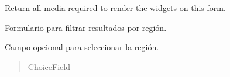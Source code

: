 \documentclass[letterpaper,10pt,spanish]{sphinxmanual}
\begin{document}
\begin{fulllineitems}
\begin{fulllineitems}

\pysigstartsignatures
{}
\pysigstopsignatures
\sphinxAtStartPar
Return all media required to render the widgets on this form.

\end{fulllineitems}


\end{fulllineitems}



\begin{fulllineitems}

\pysigstartsignatures
{}
\pysigstopsignatures
\sphinxAtStartPar
Formulario para filtrar resultados por región.


\begin{fulllineitems}

\pysigstartsignatures
{}
\pysigstopsignatures
\sphinxAtStartPar
Campo opcional para seleccionar la región.
\begin{quote}\begin{description}
\sphinxAtStartPar
ChoiceField

\end{description}\end{quote}

\end{fulllineitems}



\begin{fulllineitems}

\pysigstartsignatures
{}
\pysigstopsignatures
\end{fulllineitems}



\begin{fulllineitems}

\pysigstartsignatures
{}
\pysigstopsignatures
\end{fulllineitems}




\end{fulllineitems}
\end{document}
